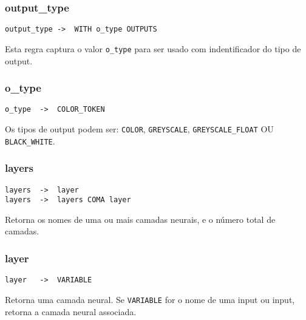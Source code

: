\documentclass[a4paper,10pt]{article}
\begin{document}
\vspace{10mm}


	\subsubsection{output\_type}
		\begin{lstlisting}
output_type	->	WITH o_type OUTPUTS
		\end{lstlisting}

Esta regra captura o valor \texttt{o\_type} para ser usado com indentificador do tipo de output.

\vspace{10mm}


	\subsubsection{o\_type}
		\begin{lstlisting}
o_type	->	COLOR_TOKEN
		\end{lstlisting}
Os tipos de output podem ser: \texttt{COLOR}, \texttt{GREYSCALE}, \texttt{GREYSCALE\_FLOAT} OU \texttt{BLACK\_WHITE}.
\vspace{10mm}


	\subsubsection{layers}
		\begin{lstlisting}
layers	->	layer
layers	->	layers COMA layer      
		\end{lstlisting}

Retorna os nomes de uma ou mais camadas neurais, e o n\'umero total de camadas.
\vspace{10mm}


	\subsubsection{layer}
		\begin{lstlisting}
layer	->	VARIABLE 
		\end{lstlisting}
Retorna uma camada neural. Se \texttt{VARIABLE} for o nome de uma input ou input, retorna a camada neural associada.
\vspace{10mm}
\end{document}
